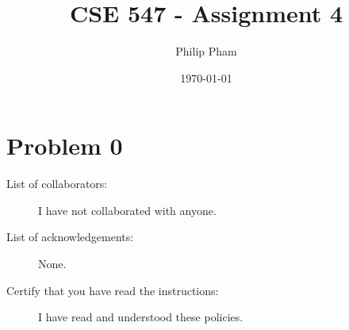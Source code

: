 \documentclass[letterpaper,11pt]{article}
\author{Philip Pham}
\date{\today}
\title{CSE 547 - Assignment 4}
\begin{document}
\maketitle

\section*{Problem 0}

\begin{description}
\item[List of collaborators:] I have not collaborated with anyone.
\item[List of acknowledgements:] None.
\item[Certify that you have read the instructions:] I have read and understood
  these policies.
\end{description}



% 
\end{document}
